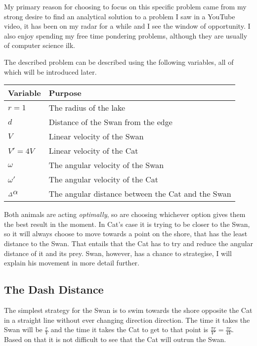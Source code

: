 \documentclass[12pt]{article}
\begin{document}
My primary reason for choosing to focus on this specific problem came from my strong desire to find an analytical solution to a problem I saw in a YouTube video\cite{Catandmouse}, it has been on my radar for a while and I see the window of opportunity. I also enjoy spending my free time pondering problems, although they are usually of computer science ilk.  

The described problem can be described using the following variables, all of which will be introduced later.

\begin{tabular}{|l|l|}
\hline
\textbf{Variable} & \textbf{Purpose}\\
\hline
$r = 1$ & The radius of the lake\\
$d$ & Distance of the Swan from the edge\\
$V$ & Linear velocity of the Swan\\
$V' = 4V$ & Linear velocity of the Cat\\
$\omega$ & The angular velocity of the Swan\\
$\omega'$ & The angular velocity of the Cat\\
$_\Delta \alpha$ & The angular distance between the Cat and the Swan\\
\hline
\end{tabular}
\vspace{12pt}

Both animals are acting \textit{optimally}, so are choosing whichever option gives them the best result in the moment. In Cat's case it is trying to be closer to the Swan, so it will always choose to move towards a point on the shore, that has the least distance to the Swan. That entails that the Cat has to try and reduce the angular distance of it and its prey. Swan, however, has a chance to strategise, I will explain his movement in more detail further.

\begin{center}
\end{center}

\subsection{The Dash Distance}

The simplest strategy for the Swan is to swim towards the shore opposite the Cat in a straight line without ever changing direction direction. The time it takes the Swan will be $\frac{r}{V}$ and the time it takes the Cat to get to that point is $\frac{\pi r}{V'} = \frac{\pi r}{4V}$. Based on that it is not difficult to see that the Cat will outrun the Swan.
\end{document}
